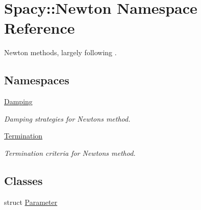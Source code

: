 \hypertarget{namespaceSpacy_1_1Newton}{}\section{Spacy\+:\+:Newton Namespace Reference}
\label{namespaceSpacy_1_1Newton}


Newton methods, largely following \cite{Deuflhard2004}.  


\subsection*{Namespaces}
\begin{DoxyCompactItemize}
\item 
 \hyperlink{namespaceSpacy_1_1Newton_1_1Damping}{Damping}
\begin{DoxyCompactList}\small\item\em Damping strategies for Newton\textquotesingle{}s method. \end{DoxyCompactList}\item 
 \hyperlink{namespaceSpacy_1_1Newton_1_1Termination}{Termination}
\begin{DoxyCompactList}\small\item\em Termination criteria for Newton\textquotesingle{}s method. \end{DoxyCompactList}\end{DoxyCompactItemize}
\subsection*{Classes}
\begin{DoxyCompactItemize}
\item 
struct \hyperlink{structSpacy_1_1Newton_1_1Parameter}{Parameter}
\end{DoxyCompactItemize}

